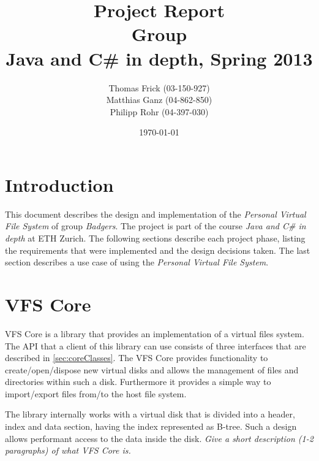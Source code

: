 \documentclass[a4paper,12pt]{article}
\title{
Project Report \\ 
Group \groupname \\
\vspace{5mm}
\large Java and C\# in depth, Spring 2013
}
\author{
Thomas Frick (03-150-927)\\
Matthias Ganz (04-862-850)\\
Philipp Rohr (04-397-030)
}
\date{\today}
\newcommand{\groupname}{Badgers\xspace}
\begin{document}
\maketitle


\section{Introduction}

This document describes the design and implementation of the \emph{Personal Virtual File System} of group \emph{\groupname}. The project is part of the course \emph{Java and C\# in depth} at ETH Zurich. The following sections describe each project phase, listing the requirements that were implemented and the design decisions taken. The last section describes a use case of using the \emph{Personal Virtual File System}.


\section{VFS Core}



VFS Core is a library that provides an implementation of a virtual files system.
The API that a client of this library can use consists of three interfaces that
are described in \ref{sec:coreClasses}. The VFS Core provides functionality to
create/open/dispose new virtual disks and allows the management of files and
directories within such a disk. Furthermore it provides a simple way to
import/export files from/to the host file system.

The library internally works with a virtual disk that is divided into a header,
index and data section, having the index represented as B-tree. Such a design
allows performant access to the data inside the disk.
\emph{Give a short description (1-2 paragraphs) of what VFS Core is.}










\end{document}
